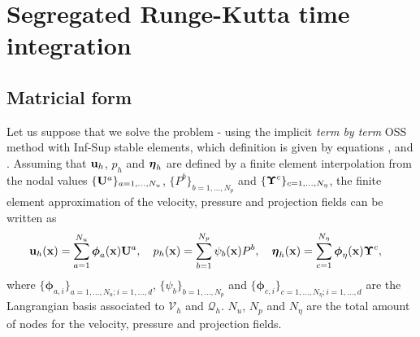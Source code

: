 \section{Segregated Runge-Kutta time integration}
\label{sec-C7_SRK}
\subsection{Matricial form}
Let us suppose that we solve the problem - using the implicit \textit{term by term} OSS method with Inf-Sup stable elements, which definition is given by equations ,  and . Assuming that ${\bf u}_h$, $p_h$ and $\boldsymbol{\eta}_h$ are defined by a finite element interpolation from the nodal values $\{{\bf U}^a\}_{a=1,...,N_u}$, $\{P^b\}_{b=1,...,N_p}$ and $\{\boldsymbol{\Upsilon}^c\}_{c=1,...,N_\eta}$, the finite element approximation of the velocity, pressure and projection fields can be written as
\begin{align*}
&{\bf u}_h({\bf x})=\sum_{a=1}^{N_u}\boldsymbol{\phi}_a({\bf x}){\bf U}^a,\quad p_h({\bf x})=\sum_{b=1}^{N_p}\psi_b({\bf x})P^b,\quad \boldsymbol{\eta}_h({\bf x})=\sum_{c=1}^{N_\eta}\boldsymbol{\phi}_\eta({\bf x})\boldsymbol{\Upsilon}^c,
\end{align*}
where $\{\boldsymbol{\phi}_{a,i}\}_{a=1,...,N_u;i=1,...,d}$, $\{\psi_b\}_{b=1,...,N_p}$ and $\{\boldsymbol{\phi}_{c,i}\}_{c=1,...,N_\eta;i=1,...,d}$ are the Langrangian basis associated to $\mathcal{V}_h$ and $\mathcal{Q}_h$. $N_u$, $N_p$ and $N_\eta$ are the total amount of nodes for the velocity, pressure and projection fields. 

